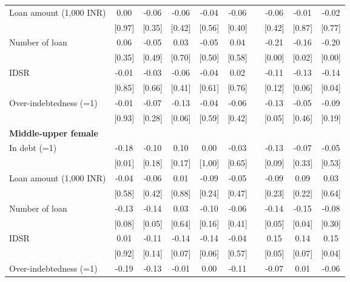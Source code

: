 \begin{table}[htbp]
{\begin{tabular}{rccccccccc}
    \multicolumn{1}{l}{Loan amount (1,000 INR)} & 0.00  & -0.06 & -0.06 & -0.04 & -0.06 &       & -0.06 & -0.01 & -0.02 \\
          & [0.97] & [0.35] & [0.42] & [0.56] & [0.40] &       & [0.42] & [0.87] & [0.77] \\
    \multicolumn{1}{l}{Number of loan } & 0.06  & -0.05 & 0.03  & -0.05 & 0.04  &       & -0.21 & -0.16 & -0.20 \\
          & [0.35] & [0.49] & [0.70] & [0.50] & [0.58] &       & [0.00] & [0.02] & [0.00] \\
    \multicolumn{1}{l}{IDSR} & -0.01 & -0.03 & -0.06 & -0.04 & 0.02  &       & -0.11 & -0.13 & -0.14 \\
          & [0.85] & [0.66] & [0.41] & [0.61] & [0.76] &       & [0.12] & [0.06] & [0.04] \\
    \multicolumn{1}{l}{Over-indebtedness (=1)} & -0.01 & -0.07 & -0.13 & -0.04 & -0.06 &       & -0.13 & -0.05 & -0.09 \\
          & [0.93] & [0.28] & [0.06] & [0.59] & [0.42] &       & [0.05] & [0.46] & [0.19] \\
    \midrule
    \multicolumn{1}{l}{\textbf{Middle-upper female}} &       &       &       &       &       &       &       &       &  \\
    \multicolumn{1}{l}{In debt (=1)} & -0.18 & -0.10 & 0.10  & 0.00  & -0.03 &       & -0.13 & -0.07 & -0.05 \\
          & [0.01] & [0.18] & [0.17] & [1.00] & [0.65] &       & [0.09] & [0.33] & [0.53] \\
    \multicolumn{1}{l}{Loan amount (1,000 INR)} & -0.04 & -0.06 & 0.01  & -0.09 & -0.05 &       & -0.09 & 0.09  & 0.03 \\
          & [0.58] & [0.42] & [0.88] & [0.24] & [0.47] &       & [0.23] & [0.22] & [0.64] \\
    \multicolumn{1}{l}{Number of loan } & -0.13 & -0.14 & 0.03  & -0.10 & -0.06 &       & -0.14 & -0.15 & -0.08 \\
          & [0.08] & [0.05] & [0.64] & [0.16] & [0.41] &       & [0.05] & [0.04] & [0.30] \\
    \multicolumn{1}{l}{IDSR} & 0.01  & -0.11 & -0.14 & -0.14 & -0.04 &       & 0.15  & 0.14  & 0.15 \\
          & [0.92] & [0.14] & [0.07] & [0.06] & [0.57] &       & [0.05] & [0.07] & [0.04] \\
    \multicolumn{1}{l}{Over-indebtedness (=1)} & -0.19 & -0.13 & -0.01 & 0.00  & -0.11 &       & -0.07 & 0.01  & -0.06 \\

\end{tabular}}
\end{table}
